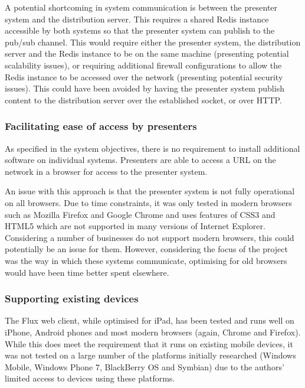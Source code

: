 \documentclass[a4papert,11pt,notitlepage]{ltxdoc}
\begin{document}
A potential shortcoming in system communication is between the presenter system and the distribution server. This requires a shared Redis instance accessible by both systems so that the presenter system can publish to the pub/sub channel. This would require either the presenter system, the distribution server and the Redis instance to be on the same machine (presenting potential scalability issues), or requiring additional firewall configurations to allow the Redis instance to be accessed over the network (presenting potential security issues). This could have been avoided by having the presenter system publish content to the distribution server over the established socket, or over HTTP.

\subsubsection{Facilitating ease of access by presenters}
As specified in the system objectives, there is no requirement to install additional software on individual systems. Presenters are able to access a URL on the network in a browser for access to the presenter system. 

An issue with this approach is that the presenter system is not fully operational on all browsers. Due to time constraints, it was only tested in modern browsers such as Mozilla Firefox and Google Chrome and uses features of CSS3 and HTML5 which are not supported in many versions of Internet Explorer. Considering a number of businesses do not support modern browsers, this could potentially be an issue for them. However, considering the focus of the project was the way in which these systems communicate, optimising for old browsers would have been time better spent elsewhere.


\subsubsection{Supporting existing devices}
\label{sec:supportexistingdevices}
The Flux web client, while optimised for iPad, has been tested and runs well on iPhone, Android phones and most modern browsers (again, Chrome and Firefox). While this does meet the requirement that it runs on existing mobile devices, it was not tested on a large number of the platforms initially researched (Windows Mobile, Windows Phone 7, BlackBerry OS and Symbian) due to the authors' limited access to devices using these platforms. 
\end{document}
